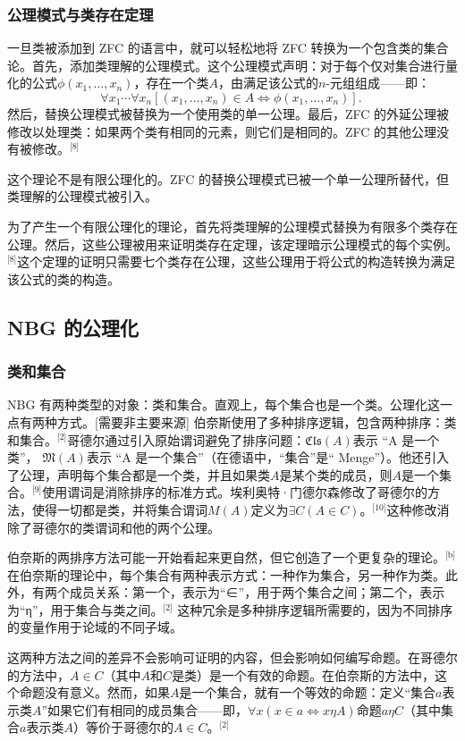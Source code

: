 \subsubsection{公理模式与类存在定理}  
一旦类被添加到 ZFC 的语言中，就可以轻松地将 ZFC 转换为一个包含类的集合论。首先，添加类理解的公理模式。这个公理模式声明：对于每个仅对集合进行量化的公式\( \phi(x_1, \ldots, x_n) \)，存在一个类\( A \)，由满足该公式的\( n \)-元组组成——即：
\[
\forall x_1 \cdots \forall x_n \left[ (x_1, \ldots, x_n) \in A \iff \phi(x_1, \ldots, x_n) \right].~
\]
然后，替换公理模式被替换为一个使用类的单一公理。最后，ZFC 的外延公理被修改以处理类：如果两个类有相同的元素，则它们是相同的。ZFC 的其他公理没有被修改。\(^\text{[8]}\)

这个理论不是有限公理化的。ZFC 的替换公理模式已被一个单一公理所替代，但类理解的公理模式被引入。

为了产生一个有限公理化的理论，首先将类理解的公理模式替换为有限多个类存在公理。然后，这些公理被用来证明类存在定理，该定理暗示公理模式的每个实例。\(^\text{[8]}\)这个定理的证明只需要七个类存在公理，这些公理用于将公式的构造转换为满足该公式的类的构造。
\subsection{NBG 的公理化}  
\subsubsection{类和集合}  
NBG 有两种类型的对象：类和集合。直观上，每个集合也是一个类。公理化这一点有两种方式。[需要非主要来源] 伯奈斯使用了多种排序逻辑，包含两种排序：类和集合。\(^\text{[2]}\)哥德尔通过引入原始谓词避免了排序问题：\( \mathfrak{Cls}(A) \)表示 “A 是一个类”，  
\( \mathfrak{M}(A) \)表示 “A 是一个集合”（在德语中，“集合”是“ Menge”）。他还引入了公理，声明每个集合都是一个类，并且如果类\( A \)是某个类的成员，则\( A \)是一个集合。\(^\text{[9]}\)使用谓词是消除排序的标准方式。埃利奥特·门德尔森修改了哥德尔的方法，使得一切都是类，并将集合谓词\( M(A) \)定义为\( \exists C (A \in C) \)。\(^\text{[10]}\)这种修改消除了哥德尔的类谓词和他的两个公理。

伯奈斯的两排序方法可能一开始看起来更自然，但它创造了一个更复杂的理论。\(^\text{[b]}\)在伯奈斯的理论中，每个集合有两种表示方式：一种作为集合，另一种作为类。此外，有两个成员关系：第一个，表示为“∈”，用于两个集合之间；第二个，表示为“η”，用于集合与类之间。\(^\text{[2]}\) 这种冗余是多种排序逻辑所需要的，因为不同排序的变量作用于论域的不同子域。

这两种方法之间的差异不会影响可证明的内容，但会影响如何编写命题。在哥德尔的方法中，\( A \in C \)（其中\( A \)和\( C \)是类）是一个有效的命题。在伯奈斯的方法中，这个命题没有意义。然而，如果\( A \)是一个集合，就有一个等效的命题：定义“集合\( a \)表示类\( A \)”如果它们有相同的成员集合——即，\(\forall x (x \in a \iff x \eta A)\)命题\( a \eta C \)（其中集合\( a \)表示类\( A \)）等价于哥德尔的\( A \in C \)。\(^\text{[2]}\)

